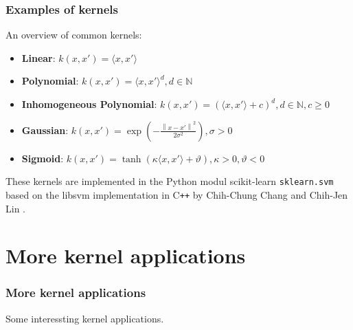 \documentclass{beamer}
\begin{document}
\begin{frame}{}
	\frametitle{Examples of kernels}
    An overview of common kernels:
    \begin{itemize}
        \item \textbf{Linear}: $k(x,x') = \langle x, x' \rangle$
        \item \textbf{Polynomial}: $k(x,x') = \langle x, x' \rangle^{d}, d \in \mathbb{N}$
        \item \textbf{Inhomogeneous Polynomial}: $k(x,x') = \left( \langle x, x' \rangle + c \right)^{d}, d \in \mathbb{N}, c \geq 0$
        \item \textbf{Gaussian}: $k(x, x') = \exp \left( - \frac{\left\lVert x - x' \right\rVert^2}{2 \sigma^2} \right), \sigma > 0$
        \item \textbf{Sigmoid}: $k(x, x') = \tanh \left( \kappa \langle x, x' \rangle + \vartheta \right), \kappa > 0, \vartheta < 0$
    \end{itemize}
    \bigskip
    These kernels are implemented in the Python modul scikit-learn \texttt{sklearn.svm} based on the libsvm implementation in C\texttt{++} by Chih-Chung Chang and Chih-Jen Lin \cite{libsvm}.
\end{frame}




\section{More kernel applications}

\begin{frame}{}
	\frametitle{More kernel applications}
    Some interessting kernel applications.
\end{frame}



\end{document}
